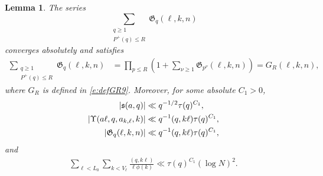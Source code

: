 \documentclass[12pt,reqno]{amsart}
\numberwithin{equation}{section}
\newtheorem{lemma}[equation]{Lemma}
\theoremstyle{definition}
\theoremstyle{remark}
\begin{document}
\begin{lemma}
\label{l:arithmeticcoefficients9}
The series
\[
 \sum_{\substack{q\geq1\\P^+(q)\leq R}}
 \mathfrak G_q(\ell,k,n)
\]
converges absolutely and satisfies
\begin{align}\label{e:localGR92}
 \sum_{\substack{q\geq1\\P^+(q)\leq R}}
 \mathfrak G_q(\ell,k,n)
 &=
 \prod_{p\leq R}
 \left(1+\sum_{\nu\geq1}
 \mathfrak G_{p^\nu}(\ell,k,n)\right)
 =G_R(\ell,k,n),
\end{align}
where \(G_R\) is defined in \eqref{e:defGR9}.
Moreover, for some absolute \(C_1>0\),
\begin{align}\label{e:arithmeticcoefficients9}
 |\mathfrak s(a,q)|
 &\ll q^{-1/2}\tau(q)^{C_1},\notag\\
 |\Upsilon(a\ell,q,a_{k,\ell},k)|
 &\ll q^{-1}(q,k\ell)\tau(q)^{C_1},\\
 |\mathfrak G_q(\ell,k,n)|
 &\ll q^{-1}(q,k\ell)\tau(q)^{C_1},\notag
\end{align}
and
\begin{align}\label{e:harmonicsum9}
 \sum_{\ell<L_0}\sum_{k<V_\ell}
 \frac{(q,k\ell)}{\ell\phi(k)}
 \ll \tau(q)^{C_1}(\log N)^2.
\end{align}
\end{lemma}
\end{document}
